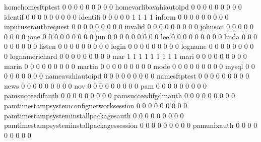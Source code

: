 \documentclass[compress,8pt]{beamer}
\begin{document}
\begin{frame}
\begin{Schunk}
  homehomesftptest                           0   0   0   0   0   0   0   0   0
  homevarlibavahiautoipd                     0   0   0   0   0   0   0   0   0
  identif                                    0   0   0   0   0   0   0   0   0
  identifi                                   0   0   0   0   0   1   1   1   1
  inform                                     0   0   0   0   0   0   0   0   0
  inputuserauthrequest                       0   0   0   0   0   0   0   0   0
  invalid                                    0   0   0   0   0   0   0   0   0
  johnson                                    0   0   0   0   0   0   0   0   0
  jone                                       0   0   0   0   0   0   0   0   0
  jun                                        0   0   0   0   0   0   0   0   0
  lee                                        0   0   0   0   0   0   0   0   0
  linda                                      0   0   0   0   0   0   0   0   0
  listen                                     0   0   0   0   0   0   0   0   0
  login                                      0   0   0   0   0   0   0   0   0
  logname                                    0   0   0   0   0   0   0   0   0
  lognamerichard                             0   0   0   0   0   0   0   0   0
  mar                                        1   1   1   1   1   1   1   1   1
  mari                                       0   0   0   0   0   0   0   0   0
  marin                                      0   0   0   0   0   0   0   0   0
  martin                                     0   0   0   0   0   0   0   0   0
  mode                                       0   0   0   0   0   0   0   0   0
  mysql                                      0   0   0   0   0   0   0   0   0
  nameavahiautoipd                           0   0   0   0   0   0   0   0   0
  namesftptest                               0   0   0   0   0   0   0   0   0
  news                                       0   0   0   0   0   0   0   0   0
  nov                                        0   0   0   0   0   0   0   0   0
  pam                                        0   0   0   0   0   0   0   0   0
  pamsucceedifauth                           0   0   0   0   0   0   0   0   0
  pamsucceedifgdmauth                        0   0   0   0   0   0   0   0   0
  pamtimestampsystemconfignetworksession     0   0   0   0   0   0   0   0   0
  pamtimestampsysteminstallpackagesauth      0   0   0   0   0   0   0   0   0
  pamtimestampsysteminstallpackagessession   0   0   0   0   0   0   0   0   0
  pamunixauth                                0   0   0   0   0   0   0   0   0

\end{Schunk}
\end{frame}
\end{document}
